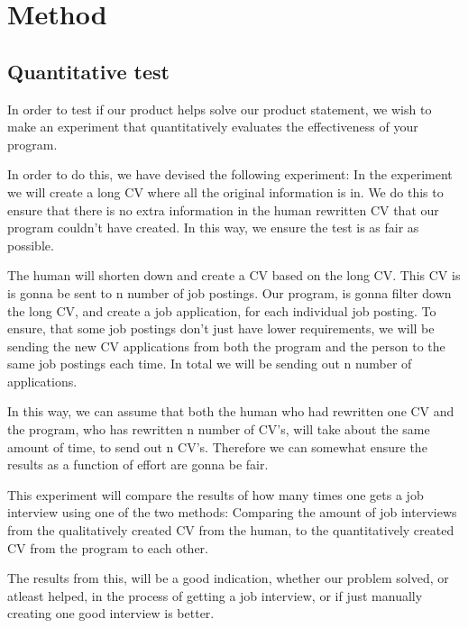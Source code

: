 \section{Method}\label{sec:method}
\subsection{Quantitative test}
In order to test if our product helps solve our product statement, we wish
to make an experiment that quantitatively evaluates the effectiveness of your
program. 

In order to do this, we have devised the following experiment:
In the experiment we will create a long CV where all the original information
is in. We do this to ensure that there is no extra information in the human 
rewritten CV that our program couldn't have created. In this way, we ensure
the test is as fair as possible. 

The human will shorten down and create a CV based on the long CV. This CV is
is gonna be sent to n number of job postings.
Our program, is gonna filter down the long CV, and create a job application,
for each individual job posting. 
To ensure, that some job postings don't just have lower requirements, we will be
sending the new CV applications from both the program and the person to the same 
job postings each time. In total we will be sending out n number of applications.

In this way, we can assume that both the human who had rewritten one
CV and the program, who has rewritten n number of CV's,
will take about the same amount of time, to send out n CV's.
Therefore we can somewhat ensure the results as a function of effort are gonna
be fair.

This experiment will compare the results of how many times one gets a job
interview using one of the two methods: Comparing the amount of 
job interviews from the qualitatively created CV from
the human, to the quantitatively created CV from the program to
each other.

The results from this, will be a good indication, whether our problem solved, or
atleast helped, in the process of getting a job interview, or if just manually
creating one good interview is better.
